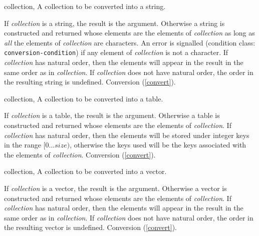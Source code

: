 \begin{optDefinition}
%
\begin{specargs}
    \item[collection, \classref{collection}] A collection to be converted into a
    string.
\end{specargs}
%
\result%
If {\em collection\/} is a string, the result is the argument.
Otherwise a string is constructed and returned whose elements are the elements
of {\em collection\/} as long as {\em all\/} the elements of {\em collection\/}
are characters.  An error is signalled (condition class: {\tt
    conversion-condition}) if any element
of {\em collection\/} is not a character.  If {\em collection\/} has natural
order, then the elements will appear in the result in the same order as in {\em
    collection}.  If {\em collection\/} does not have natural order, the order
in the resulting string is undefined.
%
\seealso%
Conversion (\ref{convert}).

%
\begin{specargs}
    \item[collection, \classref{collection}] A collection to be converted into a
    table.
\end{specargs}
%
\result%
If {\em collection\/} is a table, the result is the argument.  Otherwise
a table is constructed and returned whose elements are the elements of {\em
    collection}.  If {\em collection\/} has natural order, then the elements
will be stored under integer keys in the range $[0\ldots{}size)$, otherwise the
keys used will be the keys associated with the elements of {\em collection}.
%
\seealso%
Conversion (\ref{convert}).

%
\begin{specargs}
    \item[collection, \classref{collection}] A collection to be converted into a
    vector.
\end{specargs}
%
\result%
If {\em collection\/} is a vector, the result is the argument.
Otherwise a vector is constructed and returned whose elements are the elements
of {\em collection}.  If {\em collection\/} has natural order, then the elements
will appear in the result in the same order as in {\em collection}.  If {\em
    collection\/} does not have natural order, the order in the resulting vector
is undefined.
%
\seealso%
Conversion (\ref{convert}).
%
\end{optDefinition}
